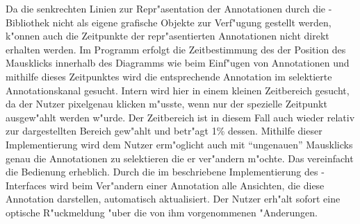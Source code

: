 Da die senkrechten Linien zur Repr"asentation der Annotationen durch die \jfcNS-Bibliothek nicht als eigene grafische Objekte zur Verf"ugung gestellt werden, k"onnen auch die Zeitpunkte der repr"asentierten Annotationen nicht direkt erhalten werden.
Im Programm erfolgt die Zeitbestimmung des der Position des Mausklicks innerhalb des Diagramms wie beim Einf"ugen von Annotationen und mithilfe dieses Zeitpunktes wird die entsprechende Annotation im selektierte Annotationskanal gesucht.
Intern wird hier in einem kleinen Zeitbereich gesucht, da der Nutzer pixelgenau klicken m"usste, wenn nur der spezielle Zeitpunkt ausgew"ahlt werden w"urde.
Der Zeitbereich ist in diesem Fall auch wieder relativ zur dargestellten Bereich gew"ahlt und betr"agt \unit{1}{\%} dessen.
Mithilfe dieser Implementierung wird dem Nutzer erm"oglicht auch mit "`ungenauen"' Mausklicks genau die Annotationen zu selektieren die er ver"andern m"ochte.
Das vereinfacht die Bedienung erheblich.
Durch die im  beschriebene Implementierung des -Interfaces wird beim Ver"andern einer Annotation alle Ansichten, die diese Annotation darstellen, automatisch aktualisiert.
Der Nutzer erh"alt sofort eine optische R"uckmeldung "uber die von ihm vorgenommenen "Anderungen.


